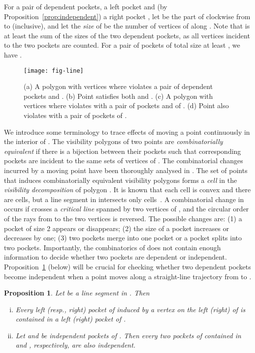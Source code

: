 \documentclass[12pt]{article}
\newtheorem{proposition}{Proposition}
\begin{document}
For a pair of dependent pockets, a left pocket  and (by Proposition~\ref{prop:independent}) a right pocket , let  be the part of  clockwise from  to  (inclusive), and let the \emph{size} of  be the number of vertices of  along . Note that
 is at least the sum of the sizes of the two dependent pockets, as all vertices incident to the two pockets are counted. For a pair of pockets of total size at least , we have .

\begin{figure}[htbp]
  \centering
  \texttt{[image: fig-line]}
  \caption{\label{fig:line}
(a) A polygon with  vertices where  violates  a pair of dependent
    pockets  and .
(b) Point  satisfies both  and .
(c) A polygon with  vertices where  violates  with
    a pair of pockets  and  of .
(d) Point  also violates  with a pair of pockets of .}
\end{figure}

We introduce some terminology to trace effects of moving a point  continuously in the interior of .
The visibility polygons of two points are \emph{combinatorially equivalent} if there is a bijection between their pockets such that corresponding pockets are incident to the same sets of vertices of .
The combinatorial changes incurred by a moving point  have been thoroughly analysed in \cite{AGTZ02,BLM02,CW12}.
The set of points  that induces combinatorially equivalent visibility polygons  forms a \emph{cell} in the \emph{visibility decomposition}  of polygon . It is known that each cell is convex and there are  cells, but a line segment in  intersects only  cells~\cite{BLM02,CD98}.
A combinatorial change in  occurs if  crosses a \emph{critical line} spanned by two vertices of , and the circular order of the rays from  to the two vertices is reversed.
The possible changes are: (1) a pocket of size 2 appears or disappears; (2) the size of a pocket increases or decreases by one; (3) two pockets merge into one pocket or a pocket splits into two pockets.
Importantly, the combinatorics of  does not contain enough information to decide whether two pockets are dependent or independent. Proposition~\ref{prop:sliding-pockets} (below) will be crucial for checking whether two dependent pockets become independent when a point  moves along a straight-line trajectory from  to .


\begin{proposition} \label{prop:sliding-pockets}
Let  be a line segment in . Then
\begin{enumerate}[(i)]
\item Every left (resp., right) pocket of  induced by a
vertex on the left (right) of 
is contained in a left (right) pocket of .
\item Let  and  be independent pockets of .
Then every two pockets of  contained in  and , respectively, are also independent.
\end{enumerate}
\end{proposition}
\end{document}

